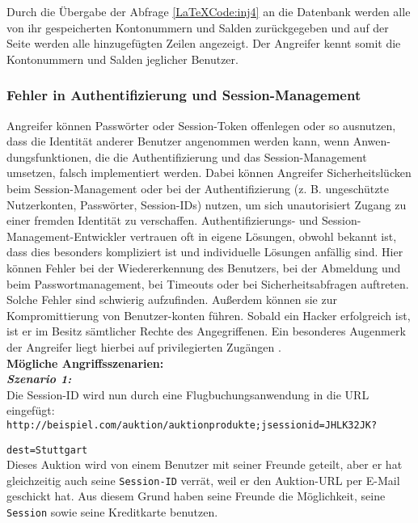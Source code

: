 Durch die Übergabe der Abfrage \ref{LaTeXCode:inj4} an die Datenbank werden alle von ihr gespeicherten Kontonummern und Salden zurückgegeben und auf der Seite werden alle hinzugefügten Zeilen angezeigt. Der Angreifer kennt somit die Kontonummern und Salden jeglicher Benutzer.

\subsubsection{Fehler in Authentifizierung und Session-Management}

Angreifer können Passwörter oder Session-Token offenlegen oder so ausnutzen, dass die Identität anderer Benutzer angenommen werden kann, wenn Anwen-dungsfunktionen, die die Authentifizierung und das Session-Management umsetzen, falsch implementiert werden. Dabei können Angreifer Sicherheitslücken beim Session-Management oder bei der Authentifizierung (z. B. ungeschützte Nutzerkonten, Passwörter, Session-IDs) nutzen, um sich unautorisiert Zugang zu einer fremden Identität zu verschaffen. Authentifizierungs- und Session-Management-Entwickler vertrauen oft in eigene Lösungen, obwohl bekannt ist, dass dies besonders kompliziert ist und individuelle Lösungen anfällig sind. Hier können Fehler bei der Wiedererkennung des Benutzers, bei der Abmeldung und beim Passwortmanagement, bei Timeouts oder bei Sicherheitsabfragen auftreten. Solche Fehler sind schwierig aufzufinden. Außerdem können sie zur Kompromittierung von Benutzer-konten führen. Sobald ein Hacker erfolgreich ist, ist er im Besitz sämtlicher Rechte des Angegriffenen. Ein besonderes Augenmerk der Angreifer liegt hierbei auf privilegierten Zugängen \cite{owasp13top10}.\\

\textbf{Mögliche Angriffsszenarien:}\\

\textbf{\textit{Szenario 1:}}\\
Die Session-ID wird nun durch eine Flugbuchungsanwendung   in die URL eingefügt\cite{owasp13top10}:\\

\texttt{http://beispiel.com/auktion/auktionprodukte;jsessionid=JHLK32JK?}

\texttt{dest=Stuttgart}\\

Dieses Auktion wird von einem Benutzer mit seiner Freunde geteilt, aber er hat gleichzeitig auch seine \texttt{Session-ID} verrät, weil er den Auktion-URL per E-Mail geschickt hat. Aus diesem Grund  haben seine Freunde die Möglichkeit, seine \texttt{Session} sowie seine Kreditkarte benutzen.\\

